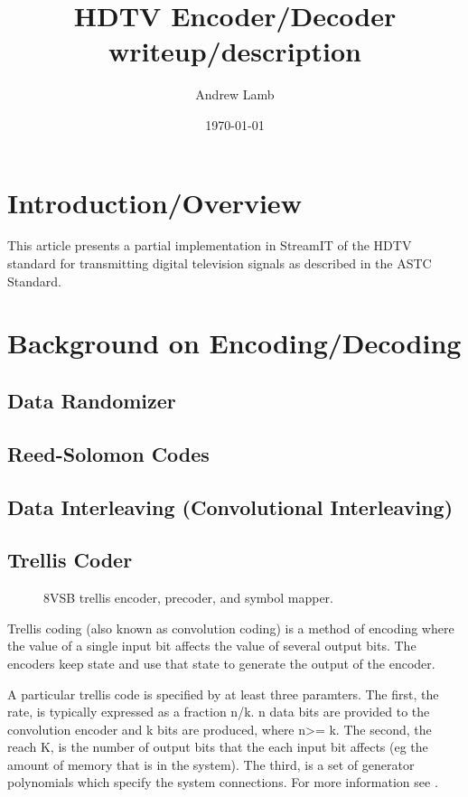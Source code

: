 \documentclass{article}
\title{HDTV Encoder/Decoder writeup/description}
\author{Andrew Lamb}
\date{\today}
\begin{document}
\maketitle
\newpage

\section{Introduction/Overview}
This article presents a partial implementation in StreamIT of the HDTV standard 
for transmitting digital television signals as described in 
the ASTC Standard\cite{atsc:a53b}.

\section{Background on Encoding/Decoding}

\subsection{Data Randomizer}

\subsection{Reed-Solomon Codes}

\subsection{Data Interleaving (Convolutional Interleaving)}

\subsection{Trellis Coder}
\begin{figure}
\center
\epsfxsize=5.5in
\caption{8VSB trellis encoder, precoder, and symbol mapper.}
\label{fig:trellis-system}
\end{figure}

Trellis coding (also known as convolution coding) 
is a method of encoding where the value of a single input 
bit affects the value of several output bits. The encoders
keep state and use that state to generate the output of the 
encoder. 

A particular trellis code is 
specified by at least three paramters. The first, the rate, is typically expressed as
a fraction n/k. n data bits are provided to the convolution encoder and k bits are produced,
where n>= k. The second, the reach K, is the number of output bits that the
each input bit affects (eg the amount of memory that is in the system). 
The third, is a set of generator polynomials which specify the system connections.
For more information see \cite{fleming:tutorial}.
\end{document}
